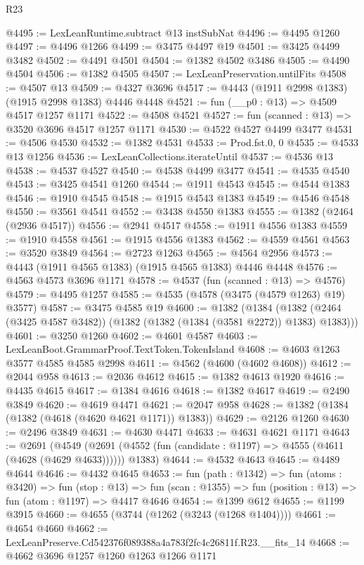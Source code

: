 \begin{lexlean}{R23}
\begin{coremodule}
@4495 := LexLeanRuntime.subtract @13 instSubNat
@4496 := @4495 @1260
@4497 := @4496 @1266
@4499 := @3475 @4497 @19
@4501 := @3425 @4499 @3482
@4502 := @4491 @4501
@4504 := @1382 @4502 @3486
@4505 := @4490 @4504
@4506 := @1382 @4505
@4507 := LexLeanPreservation.untilFits
@4508 := @4507 @13
@4509 := @4327 @3696
@4517 := @4443 (@1911 @2998 @1383) (@1915 @2998 @1383) @4446 @4448
@4521 := fun (__p0 : @13) => @4509 @4517 @1257 @1171
@4522 := @4508 @4521
@4527 := fun (scanned : @13) => @3520 @3696 @4517 @1257 @1171
@4530 := @4522 @4527 @4499 @3477
@4531 := @4506 @4530
@4532 := @1382 @4531
@4533 := Prod.fst.{0, 0}
@4535 := @4533 @13 @1256
@4536 := LexLeanCollections.iterateUntil
@4537 := @4536 @13
@4538 := @4537 @4527
@4540 := @4538 @4499 @3477
@4541 := @4535 @4540
@4543 := @3425 @4541 @1260
@4544 := @1911 @4543
@4545 := @4544 @1383
@4546 := @1910 @4545
@4548 := @1915 @4543 @1383
@4549 := @4546 @4548
@4550 := @3561 @4541
@4552 := @3438 @4550 @1383
@4555 := @1382 (@2464 (@2936 @4517))
@4556 := @2941 @4517
@4558 := @1911 @4556 @1383
@4559 := @1910 @4558
@4561 := @1915 @4556 @1383
@4562 := @4559 @4561
@4563 := @3520 @3849
@4564 := @2723 @1263
@4565 := @4564 @2956
@4573 := @4443 (@1911 @4565 @1383) (@1915 @4565 @1383) @4446 @4448
@4576 := @4563 @4573 @3696 @1171
@4578 := @4537 (fun (scanned : @13) => @4576)
@4579 := @4495 @1257
@4585 := @4535 (@4578 (@3475 (@4579 @1263) @19) @3577)
@4587 := @3475 @4585 @19
@4600 := @1382
    (@1384 (@1382 (@2464 (@3425 @4587 @3482)) (@1382 (@1382 (@1384 (@3581 @2272)) @1383) @1383)))
@4601 := @3250 @1260
@4602 := @4601 @4587
@4603 := LexLeanBoot.GrammarProof.TextToken.TokenIsland
@4608 := @4603 @1263 @3577 @4585 @4585 @2998
@4611 := @4562 (@4600 (@4602 @4608))
@4612 := @2044 @958
@4613 := @2036 @4612
@4615 := @1382 @4613 @1920
@4616 := @4435 @4615
@4617 := @1384 @4616
@4618 := @1382 @4617
@4619 := @2490 @3849
@4620 := @4619 @4471
@4621 := @2047 @958
@4628 := @1382 (@1384 (@1382 (@4618 (@4620 @4621 @1171)) @1383))
@4629 := @2126 @1260
@4630 := @2496 @3849
@4631 := @4630 @4471
@4633 := @4631 @4621 @1171
@4643 := @2691
    (@4549 (@2691 (@4552 (fun (candidate : @1197) => @4555 (@4611 (@4628 (@4629 @4633)))))) @1383)
@4644 := @4532 @4643
@4645 := @4489 @4644
@4646 := @4432 @4645
@4653 := fun (path : @1342) =>
  fun (atoms : @3420) =>
  fun (stop : @13) =>
  fun (scan : @1355) => fun (position : @13) => fun (atom : @1197) => @4417 @4646
@4654 := @1399 @612
@4655 := @1199 @3915
@4660 := @4655 (@3744 (@1262 (@3243 (@1268 @1404))))
@4661 := @4654 @4660
@4662 := LexLeanPreserve.Cd542376f089388a4a783f2fc4c26811f.R23.__fits_14
@4668 := @4662 @3696 @1257 @1260 @1263 @1266 @1171

\end{coremodule}
\end{lexlean}

